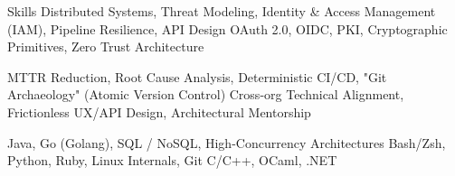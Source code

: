 

\begin{rubric}{\color{ForestGreen} Skills}
  \entry*[Domains] Distributed Systems, Threat Modeling, Identity \& Access Management (IAM), Pipeline Resilience, API Design
  \entry*[Protocols] OAuth 2.0, OIDC, PKI, Cryptographic Primitives, Zero Trust Architecture

  \entry*[Practices] MTTR Reduction, Root Cause Analysis, Deterministic CI/CD, "Git Archaeology" (Atomic Version Control)
  \entry*[Culture] Cross-org Technical Alignment, Frictionless UX/API Design, Architectural Mentorship

   Java, Go (Golang), SQL / NoSQL, High-Concurrency Architectures
   Bash/Zsh, Python, Ruby, Linux Internals, Git
  \entry*[Polyglot] C/C++, OCaml, .NET
\end{rubric}
